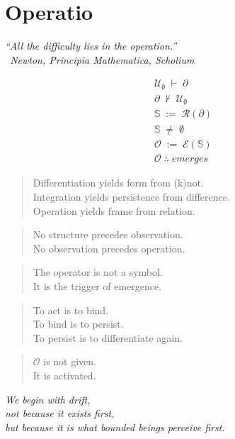 \chapter*{Operatio}
\begin{flushright}
\emph{``All the difficulty lies in the operation.''}\\
\emph{\textendash\ Newton, \textit{Principia Mathematica}, Scholium}
\end{flushright}
\vspace{1em}
\begin{center}
\Large
\renewcommand{\arraystretch}{1.35}
\[
\begin{array}{l}
\mathcal{U}_{\emptyset} \;\vdash\; \partial \\
\partial \;\nvdash\; \mathcal{U}_{\emptyset} \\
\mathbb{S} \;:=\; \mathcal{R}(\partial) \\
\mathbb{S} \;\neq\; \emptyset \\
\mathcal{O} \;:=\; \mathcal{E}(\mathbb{S}) \\
\mathcal{O} \;\therefore\; \textit{emerges}
\end{array}
\]
\end{center}
\vspace{1em}
\begin{quote}
Differentiation yields form from (k)not.\\
Integration yields persistence from difference.\\
Operation yields frame from relation.
\end{quote}
\begin{quote}
No structure precedes observation.\\
No observation precedes operation.
\end{quote}
\begin{quote}
The operator is not a symbol.\\
It is the trigger of emergence.
\end{quote}
\begin{quote}
To act is to bind.\\
To bind is to persist.\\
To persist is to differentiate again.
\end{quote}
\begin{quote}
$\mathcal{O}$ is not given.\\
It is activated.
\end{quote}
\bigskip
\begin{center}
\emph{We begin with drift,\\
not because it exists first,\\
but because it is what bounded beings perceive first.}
\end{center}
\bigskip
